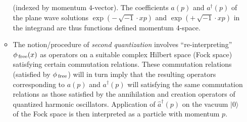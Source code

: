 \begin{itemize}
\begin{itemize}
		(indexed by momentum $4$-vector).
		The coefficients $a(p)$ and $a^{\dagger}(p)$
		of the plane wave solutions $\exp(-\,\sqrt{-1}\cdot xp)$ and $\exp(+\,\sqrt{-1}\cdot xp)$
		in the integrand are thus functions defined momentum $4$-space.
	\item
		The notion/procedure of \textit{second quantization} involves ``re-interpreting''
		$\phi_{\,\textnormal{free}}(x)$ as operators on a suitable complex Hilbert space (Fock space)
		satisfying certain commutation relations.
		These commutation relations (satisfied by $\phi_{\,\textnormal{free}}$) will in turn imply that
		the resulting operators corresponding to $a(p)$ and $a^{\dagger}(p)$ will satisfying
		the same commutation relations as those satisfied by the annihilation and creation operators
		of quantized harmonic oscillators.
		Application of $\hat{a}^{\dagger}(p)$ on the vacuum $\vert 0 \rangle$ of the Fock space
		is then interpreted as a particle with momentum $p$.
	\end{itemize}
\end{itemize}


